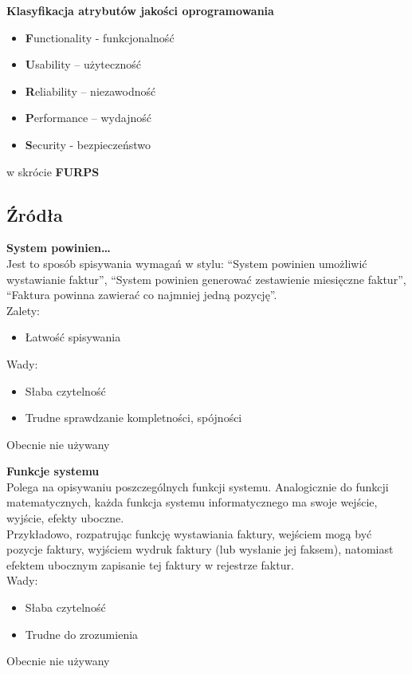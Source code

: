 \documentclass[12pt]{article}
\begin{document}
    \begin{definition}
    \textbf{Klasyfikacja atrybutów jakości oprogramowania}
    \begin{itemize}
        \item \textbf{F}unctionality - funkcjonalność
        \item \textbf{U}sability – użyteczność
        \item \textbf{R}eliability – niezawodność
        \item \textbf{P}erformance – wydajność
        \item \textbf{S}ecurity - bezpieczeństwo
    \end{itemize}
    w skrócie \textbf{FURPS}
    \end{definition}
    
    \subsection{Źródła}
    
    \begin{definition}
    \textbf{System powinien…} \\
    Jest to sposób spisywania wymagań w stylu: ``System powinien umożliwić wystawianie faktur'', ``System powinien generować zestawienie miesięczne faktur'',  ``Faktura powinna zawierać co najmniej jedną pozycję''. \\
    
    Zalety:
    \begin{itemize}
        \item Łatwość spisywania
    \end{itemize}
    
    Wady:
    \begin{itemize}
        \item Słaba czytelność
        \item Trudne sprawdzanie kompletności, spójności
    \end{itemize}
    
    Obecnie nie używany
    \end{definition}
    
    
    \begin{definition}
    \textbf{Funkcje systemu} \\
    Polega na opisywaniu poszczególnych funkcji systemu. Analogicznie do funkcji matematycznych, każda funkcja systemu informatycznego ma swoje wejście, wyjście, efekty uboczne. \\
    Przykładowo, rozpatrując funkcję wystawiania faktury, wejściem mogą być pozycje faktury, wyjściem wydruk faktury (lub wysłanie jej faksem), natomiast efektem ubocznym zapisanie tej faktury w rejestrze faktur. \\
    
    Wady:
    \begin{itemize}
        \item Słaba czytelność
        \item Trudne do zrozumienia
    \end{itemize}
    
    Obecnie nie używany
    \end{definition}
    
\end{document}
